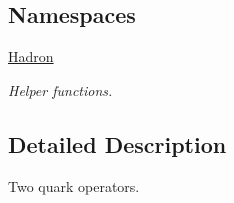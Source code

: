 \subsection*{Namespaces}
\begin{DoxyCompactItemize}
\item 
 \mbox{\hyperlink{namespaceHadron}{Hadron}}
\begin{DoxyCompactList}\small\item\em Helper functions. \end{DoxyCompactList}\end{DoxyCompactItemize}


\subsection{Detailed Description}
Two quark operators. 

